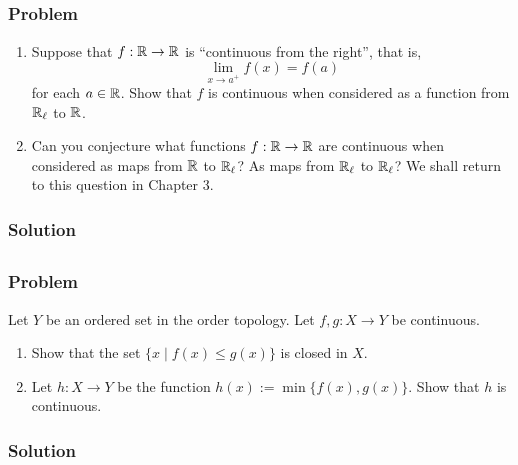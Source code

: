 
\subsection{}

\subsubsection{Problem}
\begin{enumerate}
    \item Suppose that $f : \mathbb R \to \mathbb R$ is ``continuous from the right'', that is,
    \[ \lim_{x \to a^+}f(x) = f(a) \]
    for each $a \in \mathbb R$. Show that $f$ is continuous when considered as a function from $\mathbb R_\ell$ to $\mathbb R$.
    \item Can you conjecture what functions $f : \mathbb R \to \mathbb R$ are continuous when considered as maps from $\mathbb R$ to $\mathbb R_\ell$? As maps from $\mathbb R_\ell$ to $\mathbb R_\ell$? We shall return to this question in Chapter 3.
\end{enumerate}

\subsubsection{Solution}
\todo


\subsection{}

\subsubsection{Problem}
Let $Y$ be an ordered set in the order topology. Let $f, g : X \to Y$ be continuous.
\begin{enumerate}
    \item Show that the set $\{ x \mid f(x) \leq g(x) \}$ is closed in $X$.
    \item Let $h : X \to Y$ be the function $h(x) := \min\{ f(x), g(x) \}$. Show that $h$ is continuous.
\end{enumerate}

\subsubsection{Solution}
\todo

